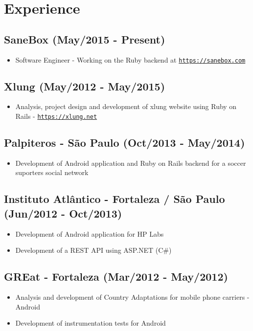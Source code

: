 \documentclass[a4paper]{article}
\begin{document}
\section*{Experience}
{\addtolength{\leftskip}{3.5mm}

\subsection*{SaneBox (May/2015 - Present)}
\begin{itemize}
\item Software Engineer - Working on the Ruby backend at \href{https://www.sanebox.com}{\tt https://sanebox.com}
\end{itemize}

\subsection*{Xlung (May/2012 - May/2015)}
\begin{itemize}
\item Analysis, project design and development of xlung website using Ruby on Rails - \href{https://xlung.net}{\tt https://xlung.net}
\end{itemize}

\subsection*{Palpiteros - São Paulo (Oct/2013 - May/2014)}
\begin{itemize}
\item Development of Android application and Ruby on Rails backend for a soccer suporters social network
\end{itemize}

\subsection*{Instituto Atlântico - Fortaleza / São Paulo (Jun/2012 - Oct/2013)}
\begin{itemize}
\item Development of Android application for HP Labs
\item Development of a REST API using ASP.NET (C\#)
\end{itemize}

\subsection*{GREat - Fortaleza (Mar/2012 - May/2012)}
\begin{itemize}
\item Analysis and development of Country Adaptations for mobile phone carriers - Android
\item Development of instrumentation tests for Android
\end{itemize}

}
\end{document}
